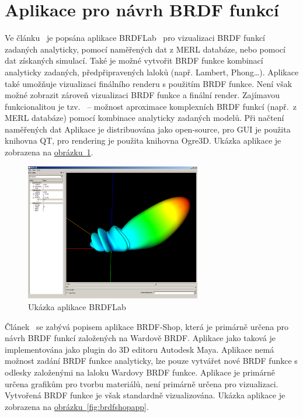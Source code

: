 \documentclass[czech,master]{diploma}
\newcommand{\appH}{6cm}
\begin{document}
\section{Aplikace pro návrh BRDF funkcí}
Ve článku~\cite{Fors2009BRDFLabAG} je popsána aplikace BRDFLab~\cite{sourceBRDFLab} pro vizualizaci BRDF funkcí zadaných analyticky, pomocí naměřených dat z MERL databáze, nebo pomocí dat získaných simulací. Také je možné vytvořit BRDF funkce kombinací analyticky zadaných, předpřipravených laloků (např. Lambert, Phong\dots). Aplikace také umožňuje vizualizaci finálního renderu s použitím BRDF funkce. Není však možné zobrazit zároveň vizualizaci BRDF funkce a finální render. Zajímavou funkcionalitou je tzv.\  -- možnost aproximace komplexních BRDF funkcí (např.\ z MERL databáze) pomocí kombinace analyticky zadaných modelů. Při načtení naměřených dat Aplikace je distribuována jako open-source, pro GUI je použita knihovna QT, pro rendering je použita knihovna Ogre3D. Ukázka aplikace je zobrazena na \hyperref[fig:brdflabApp]{obrázku~\ref{fig:brdflabApp}}.\par

\begin{figure}[ht]
  \centering
  \includegraphics[height=\appH]{Figures/brdflab.png}
  \caption[Ukázka aplikace BRDFLab]{Ukázka aplikace BRDFLab~\cite{Fors2009BRDFLabAG}}%
  \label{fig:brdflabApp}%
\end{figure}

Článek~\cite{brdfshop} se zabývá popisem aplikace BRDF-Shop, která je primárně určena pro návrh BRDF funkcí založených na Wardově BRDF\@. Aplikace jako taková je implementována jako plugin do 3D editoru Autodesk Maya. Aplikace nemá možnost zadání BRDF funkce analyticky, lze pouze vytvářet nové BRDF funkce s odlesky založenými na laloku Wardovy BRDF funkce. Aplikace je primárně určena grafikům pro tvorbu materiálů, není primárně určena pro vizualizaci. Vytvořená BRDF funkce je však standardně vizualizována. Ukázka aplikace je zobrazena na \hyperref[fig:brdflabApp]{obrázku~\ref{fig:brdfshopapp}}.
\end{document}
